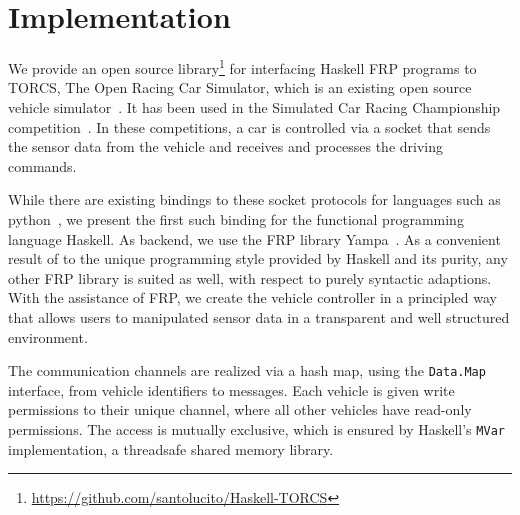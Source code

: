 \section{Implementation}

We provide an open source library\footnote{\url{https://github.com/santolucito/Haskell-TORCS}} for interfacing Haskell FRP programs to TORCS, The Open Racing Car Simulator, which is an existing open source vehicle simulator~\cite{torcs}.
It has been used in the Simulated Car Racing Championship competition~\cite{SCRC}.
In these competitions, a car is controlled via a socket that sends the sensor data from the vehicle and receives and processes the driving commands.

While there are existing bindings to these socket protocols for languages such as python~\cite{snakeoil,pyscrc}, we present the first such binding for the functional programming language Haskell. 
As backend, we use the FRP library Yampa~\cite{courtney2003yampa}. 
As a convenient result of to the unique programming style provided by Haskell and its purity, any other FRP library is suited as well, with respect to purely syntactic adaptions.
With the assistance of FRP, we create the  vehicle controller in a principled way that allows users to manipulated sensor data in a transparent and well structured environment.



The communication channels are realized via a hash map, using the \texttt{Data.Map} interface, from vehicle identifiers to messages.
Each vehicle is given write permissions to their unique channel, where all other vehicles have read-only permissions.
The access is mutually exclusive, which is ensured by Haskell's \texttt{MVar} implementation, a threadsafe shared memory library. %
